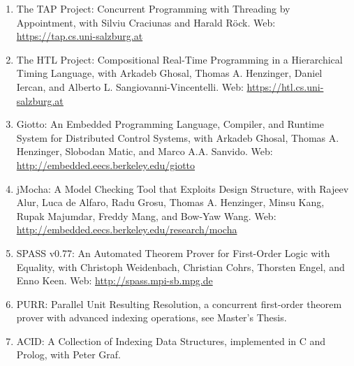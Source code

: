 {\begin{enumerate}
\item The TAP Project: Concurrent Programming with Threading by Appointment,
with Silviu Craciunas and Harald R{\"o}ck.  Web: \url{https://tap.cs.uni-salzburg.at}

\item The HTL Project: Compositional Real-Time Programming in a Hierarchical Timing Language,
with Arkadeb Ghosal, Thomas A. Henzinger, Daniel Iercan, and Alberto L. Sangiovanni-Vincentelli.
Web: \url{https://htl.cs.uni-salzburg.at}

\item Giotto: An Embedded Programming Language, Compiler, and Runtime System for Distributed Control Systems,
with Arkadeb Ghosal, Thomas A. Henzinger, Slobodan Matic, and Marco A.A. Sanvido.
Web: \url{http://embedded.eecs.berkeley.edu/giotto}

\item jMocha: A Model Checking Tool that Exploits Design Structure,
with Rajeev Alur, Luca de Alfaro, Radu Grosu, Thomas A. Henzinger,
Minsu Kang, Rupak Majumdar, Freddy Mang, and Bow-Yaw Wang.  Web:
\url{http://embedded.eecs.berkeley.edu/research/mocha}

\item SPASS v0.77: An Automated Theorem Prover for First-Order Logic with Equality,
with Christoph Weidenbach, Christian Cohrs, Thorsten Engel, and Enno
Keen.  Web: \url{http://spass.mpi-sb.mpg.de}

\item PURR: Parallel Unit Resulting Resolution, a concurrent first-order theorem prover
with advanced indexing operations, see Master's Thesis.

\item ACID: A Collection of Indexing Data Structures, implemented in C and Prolog,
with Peter Graf.
\end{enumerate}
}

